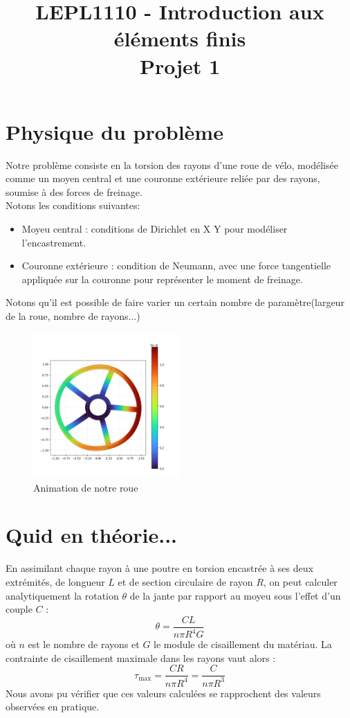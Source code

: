 \documentclass[conference]{IEEEtran}
\title{LEPL1110 - Introduction aux éléments finis
 \\ {\huge Projet 1}}
\author{
\IEEEauthorblockN{Pierre Leboutte}
\IEEEauthorblockA{\textit{4330-21-00} \\}

\IEEEauthorblockN{Giovanni Karra}
\IEEEauthorblockA{\textit{4503-21-00} \\}
}
\begin{document}
\maketitle

\section*{Physique du problème}
Notre problème consiste en la torsion des rayons d'une roue de vélo, modélisée comme un moyen central et une couronne extérieure reliée par des rayons, soumise à des forces de freinage. \\
Notons les conditions suivantes:
\begin{itemize}
    \item Moyeu central : conditions de Dirichlet en X Y pour modéliser l'encastrement.
    \item Couronne extérieure : condition de Neumann, avec une force tangentielle appliquée sur la couronne pour représenter le moment de freinage.
\end{itemize}
Notons qu'il est possible de faire varier un certain nombre de paramètre(largeur de la roue, nombre de rayons...)
\begin{figure}[h]
    \centering
    \includegraphics[width=0.5\textwidth]{../Figures/roue.png}
    \caption{Animation de notre roue}
\end{figure}


\section*{Quid en théorie...}
En assimilant chaque rayon à une poutre en torsion encastrée à ses deux extrémités, de longueur $L$ et de section circulaire de rayon $R$, on peut calculer analytiquement la rotation $\theta$ de la jante par rapport au moyeu sous l'effet d'un couple $C$ :
\begin{equation}
\theta = \frac{CL}{n\pi R^4 G}
\end{equation}
où $n$ est le nombre de rayons et $G$ le module de cisaillement du matériau. La contrainte de cisaillement maximale dans les rayons vaut alors :
\begin{equation}
\tau_\text{max} = \frac{CR}{n\pi R^4} = \frac{C}{n\pi R^3}
\end{equation}
Nous avons pu vérifier que ces valeurs calculées se rapprochent des valeurs observées en pratique. 
\end{document}
